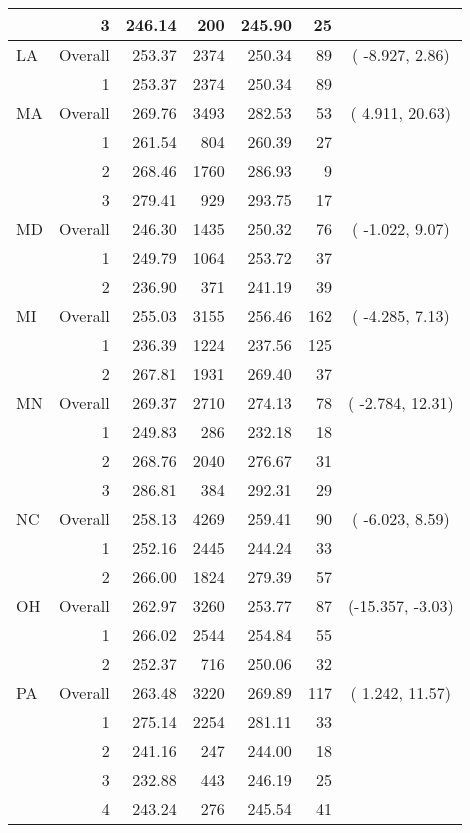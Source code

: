 \begin{longtable}{lrrr@{\extracolsep{.25cm}}rrc}
   & 3 & 246.14 & 200 & 245.90 &  25 &  \\ 
   \hline
LA & Overall & 253.37 & 2374 & 250.34 &  89 & ( -8.927,  2.86) \\ 
   & 1 & 253.37 & 2374 & 250.34 &  89 &  \\ 
   \hline
MA & Overall & 269.76 & 3493 & 282.53 &  53 & (  4.911, 20.63) \\ 
   & 1 & 261.54 & 804 & 260.39 &  27 &  \\ 
   & 2 & 268.46 & 1760 & 286.93 &   9 &  \\ 
   & 3 & 279.41 & 929 & 293.75 &  17 &  \\ 
   \hline
MD & Overall & 246.30 & 1435 & 250.32 &  76 & ( -1.022,  9.07) \\ 
   & 1 & 249.79 & 1064 & 253.72 &  37 &  \\ 
   & 2 & 236.90 & 371 & 241.19 &  39 &  \\ 
   \hline
MI & Overall & 255.03 & 3155 & 256.46 & 162 & ( -4.285,  7.13) \\ 
   & 1 & 236.39 & 1224 & 237.56 & 125 &  \\ 
   & 2 & 267.81 & 1931 & 269.40 &  37 &  \\ 
   \hline
MN & Overall & 269.37 & 2710 & 274.13 &  78 & ( -2.784, 12.31) \\ 
   & 1 & 249.83 & 286 & 232.18 &  18 &  \\ 
   & 2 & 268.76 & 2040 & 276.67 &  31 &  \\ 
   & 3 & 286.81 & 384 & 292.31 &  29 &  \\ 
   \hline
NC & Overall & 258.13 & 4269 & 259.41 &  90 & ( -6.023,  8.59) \\ 
   & 1 & 252.16 & 2445 & 244.24 &  33 &  \\ 
   & 2 & 266.00 & 1824 & 279.39 &  57 &  \\ 
   \hline
OH & Overall & 262.97 & 3260 & 253.77 &  87 & (-15.357, -3.03) \\ 
   & 1 & 266.02 & 2544 & 254.84 &  55 &  \\ 
   & 2 & 252.37 & 716 & 250.06 &  32 &  \\ 
   \hline
PA & Overall & 263.48 & 3220 & 269.89 & 117 & (  1.242, 11.57) \\ 
   & 1 & 275.14 & 2254 & 281.11 &  33 &  \\ 
   & 2 & 241.16 & 247 & 244.00 &  18 &  \\ 
   & 3 & 232.88 & 443 & 246.19 &  25 &  \\ 
   & 4 & 243.24 & 276 & 245.54 &  41 &  \\ 

\end{longtable}
